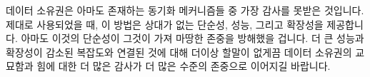 데이터 소유권은 아마도 존재하는 동기화 메커니즘들 중 가장 감사를 못받은
것입니다.
제대로 사용되었을 때, 이 방법은 상대가 없는 단순성, 성능, 그리고 확장성을
제공합니다.
아마도 이것의 단순성이 그것이 가져 마땅한 존중을 방해했을 겁니다.
더 큰 성능과 확장성이 감소된 복잡도와 연결된 것에 대해 더이상 할말이 없게끔
데이터 소유권의 교묘함과 힘에 대한 더 많은 감사가 더 많은 수준의 존중으로
이어지길 바랍니다.

\iffalse

Data ownership is perhaps the most underappreciated synchronization
mechanism in existence.
When used properly, it delivers unrivaled simplicity, performance,
and scalability.
Perhaps its simplicity costs it the respect that it deserves.
Hopefully a greater appreciation for the subtlety and power of data ownership
will lead to greater level of respect, to say nothing of leading to
greater performance and scalability coupled with reduced complexity.

\fi


